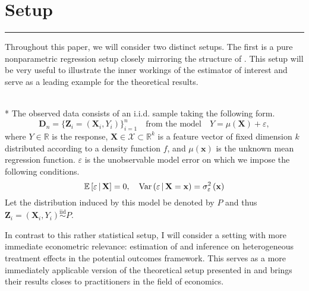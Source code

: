\section{Setup}\label{sec:setup}
\hrule
Throughout this paper, we will consider two distinct setups.
The first is a pure nonparametric regression setup closely mirroring the structure of \citet{demirkaya_optimal_2024}.
This setup will be very useful to illustrate the inner workings of the estimator of interest and serve as a leading example for the theoretical results.
\begin{boxD}
	\begin{asm}\label{asm:npr_dgp}\mbox{}\\*
		The observed data consists of an i.i.d. sample taking the following form.
		\begin{equation}\label{DGP1}
			\mathbf{D}_n = \{\mathbf{Z}_i = (\mathbf{X}_i, Y_i)\}_{i = 1}^{n}
			\quad \text{from the model} \quad
			Y = \mu(\mathbf{X}) + \varepsilon,
		\end{equation}
		where $Y \in \mathbb{R}$ is the response, $\mathbf{X} \in \mathcal{X} \subset \mathbb{R}^k$ is a feature vector of fixed dimension $k$ distributed according to a density function $f$, and $\mu(\mathbf{x})$ is the unknown mean regression function.
		$\varepsilon$ is the unobservable model error on which we impose the following conditions.
		\begin{equation}
			\mathbb{E}\left[\varepsilon \, \middle| \, \mathbf{X}\right] = 0, \quad
			\text{Var}\left(\varepsilon \, \middle| \, \mathbf{X} = \mathbf{x}\right) = \sigma_{\varepsilon}^2\left(\mathbf{x}\right)
		\end{equation}
		Let the distribution induced by this model be denoted by $P$ and thus $\mathbf{Z}_i = \left(\mathbf{X}_i, Y_i\right) \overset{\text{iid}}{\sim} P$.
	\end{asm}
\end{boxD}
In contrast to this rather statistical setup, I will consider a setting with more immediate econometric relevance: estimation of and inference on heterogeneous treatment effects in the potential outcomes framework.
This serves as a more immediately applicable version of the theoretical setup presented in \citet{ritzwoller_uniform_2024} and brings their results closes to practitioners in the field of economics.
